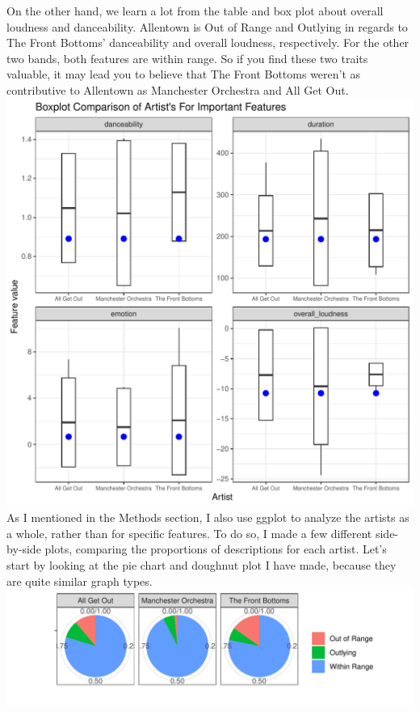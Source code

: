 \documentclass{article}\usepackage[]{graphicx}\usepackage[]{xcolor}
\makeatletter
\def\maxwidth{ %
  \ifdim\Gin@nat@width>\linewidth
    \linewidth
  \else
    \Gin@nat@width
  \fi
}
\newenvironment{knitrout}{}{} %
\makeatother
\begin{document}
\begin{multicols}{2}
On the other hand, we learn a lot from the table and box plot about overall loudness and danceability. Allentown is Out of Range and Outlying in regards to The Front Bottoms' danceability and overall loudness, respectively. For the other two bands, both features are within range. So if you find these two traits valuable, it may lead you to believe that The Front Bottoms weren't as contributive to Allentown as Manchester Orchestra and All Get Out.
\begin{knitrout}\scriptsize
{}\color{fgcolor}
\includegraphics[width=\maxwidth]{figure/unnamed-chunk-1-1} 
\end{knitrout}
As I mentioned in the Methods section, I also use ggplot to analyze the artists as a whole, rather than for specific features. To do so, I made a few different side-by-side plots, comparing the proportions of descriptions for each artist. Let's start by looking at the pie chart and doughnut plot I have made, because they are quite similar graph types.
\begin{knitrout}\scriptsize
{}\color{fgcolor}
\includegraphics[width=\maxwidth]{figure/unnamed-chunk-2-1} 


\end{knitrout}
\end{multicols}
\end{document}
